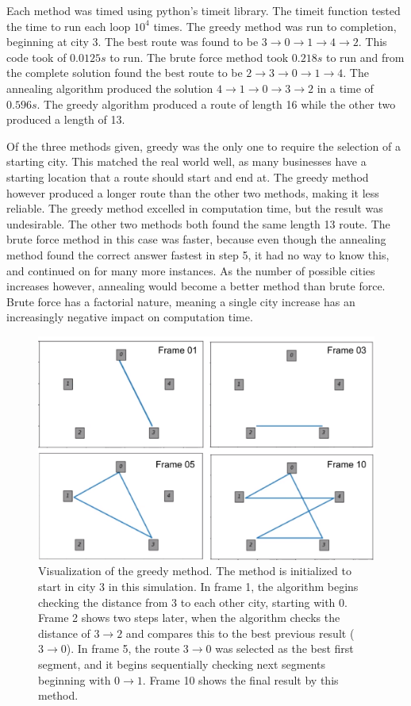 \message{ !name(Assn1.tex)}\documentclass[twocolumn]{article}
\begin{document}
Each method was timed using python's timeit library. The timeit function tested the time to run each loop $10^4$ times. The greedy method was run to completion, beginning at city 3. The best route was found to be $3 \to 0 \to 1 \to 4 \to 2$. This code took of $0.0125s$ to run. The brute force method took $0.218s$ to run and from the complete solution found the best route to be $2 \to 3 \to 0 \to 1 \to 4$. The annealing algorithm produced the solution $4 \to 1 \to 0 \to 3 \to 2$ in a time of $0.596s$. The greedy algorithm produced a route of length 16 while the other two produced a length of 13.

Of the three methods given, greedy was the only one to require the selection of a starting city. This matched the real world well, as many businesses have a starting location that a route should start and end at. The greedy method however produced a longer route than the other two methods, making it less reliable. The greedy method excelled in computation time, but the result was undesirable. The other two methods both found the same length 13 route. The brute force method in this case was faster, because even though the annealing method found the correct answer fastest in step 5, it had no way to know this, and continued on for many more instances. As the number of possible cities increases however, annealing would become a better method than brute force. Brute force has a factorial nature, meaning a single city increase has an increasingly negative impact on computation time.

\begin{figure}
\centering
\includegraphics[width=\linewidth]{greedy_4frames}
\caption{Visualization of the greedy method. The method is initialized to start in city 3 in this simulation. In frame 1, the algorithm begins checking the distance from 3 to each other city, starting with 0. Frame 2 shows two steps later, when the algorithm checks the distance of $3 \to 2$ and compares this to the best previous result ($3 \to 0$). In frame 5, the route $3 \to 0$  was selected as the best first segment, and it begins sequentially checking next segments beginning with $0 \to 1$. Frame 10 shows the final result by this method.}
\label{fig:greedy_4frames}
\end{figure}
\end{document}
